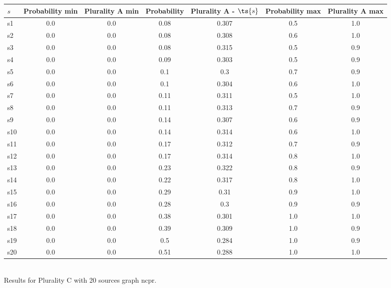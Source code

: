 \documentclass{article}
\begin{document}
\noindent\begin{tabular}{|l|c|c|c|c|c|c|}
\hline
$s$& Probability min & Plurality A min & Probability & Plurality A - $\ts{s}$ & Probability max & Plurality A max\\
\hline
s1 &0.0 & 0.0 & 0.08 & 0.307 & 0.5 & 1.0\\
\hline
s2 &0.0 & 0.0 & 0.08 & 0.308 & 0.6 & 1.0\\
\hline
s3 &0.0 & 0.0 & 0.08 & 0.315 & 0.5 & 0.9\\
\hline
s4 &0.0 & 0.0 & 0.09 & 0.303 & 0.5 & 0.9\\
\hline
s5 &0.0 & 0.0 & 0.1 & 0.3 & 0.7 & 0.9\\
\hline
s6 &0.0 & 0.0 & 0.1 & 0.304 & 0.6 & 1.0\\
\hline
s7 &0.0 & 0.0 & 0.11 & 0.311 & 0.5 & 1.0\\
\hline
s8 &0.0 & 0.0 & 0.11 & 0.313 & 0.7 & 0.9\\
\hline
s9 &0.0 & 0.0 & 0.14 & 0.307 & 0.6 & 0.9\\
\hline
s10 &0.0 & 0.0 & 0.14 & 0.314 & 0.6 & 1.0\\
\hline
s11 &0.0 & 0.0 & 0.17 & 0.312 & 0.7 & 0.9\\
\hline
s12 &0.0 & 0.0 & 0.17 & 0.314 & 0.8 & 1.0\\
\hline
s13 &0.0 & 0.0 & 0.23 & 0.322 & 0.8 & 0.9\\
\hline
s14 &0.0 & 0.0 & 0.22 & 0.317 & 0.8 & 1.0\\
\hline
s15 &0.0 & 0.0 & 0.29 & 0.31 & 0.9 & 1.0\\
\hline
s16 &0.0 & 0.0 & 0.28 & 0.3 & 0.9 & 0.9\\
\hline
s17 &0.0 & 0.0 & 0.38 & 0.301 & 1.0 & 1.0\\
\hline
s18 &0.0 & 0.0 & 0.39 & 0.309 & 1.0 & 0.9\\
\hline
s19 &0.0 & 0.0 & 0.5 & 0.284 & 1.0 & 0.9\\
\hline
s20 &0.0 & 0.0 & 0.51 & 0.288 & 1.0 & 1.0\\
\hline
\end{tabular}\\

\noindent Results for Plurality C with 20 sources graph ncpr.
\end{document}
